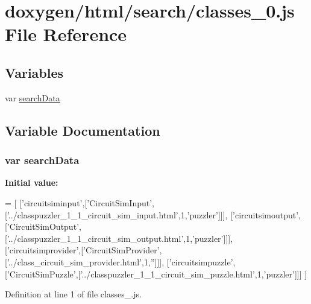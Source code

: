 \hypertarget{a00061}{}\section{doxygen/html/search/classes\+\_\+0.js File Reference}
\label{a00061}
\subsection*{Variables}
\begin{DoxyCompactItemize}
\item 
var \hyperlink{a00061_ad01a7523f103d6242ef9b0451861231e}{search\+Data}
\end{DoxyCompactItemize}


\subsection{Variable Documentation}
\hypertarget{a00061_ad01a7523f103d6242ef9b0451861231e}{}
\subsubsection[{search\+Data}]{\setlength{\rightskip}{0pt plus 5cm}var search\+Data}\label{a00061_ad01a7523f103d6242ef9b0451861231e}
{\bfseries Initial value\+:}
\begin{DoxyCode}
=
[
  [\textcolor{stringliteral}{'circuitsiminput'},[\textcolor{stringliteral}{'CircuitSimInput'},[\textcolor{stringliteral}{'../classpuzzler\_1\_1\_circuit\_sim\_input.html'},1,\textcolor{stringliteral}{'puzzler'}]]],
  [\textcolor{stringliteral}{'circuitsimoutput'},[\textcolor{stringliteral}{'CircuitSimOutput'},[\textcolor{stringliteral}{'../classpuzzler\_1\_1\_circuit\_sim\_output.html'},1,\textcolor{stringliteral}{'puzzler'}]]],
  [\textcolor{stringliteral}{'circuitsimprovider'},[\textcolor{stringliteral}{'CircuitSimProvider'},[\textcolor{stringliteral}{'../class\_circuit\_sim\_provider.html'},1,\textcolor{stringliteral}{''}]]],
  [\textcolor{stringliteral}{'circuitsimpuzzle'},[\textcolor{stringliteral}{'CircuitSimPuzzle'},[\textcolor{stringliteral}{'../classpuzzler\_1\_1\_circuit\_sim\_puzzle.html'},1,\textcolor{stringliteral}{'puzzler'}]]]
]
\end{DoxyCode}


Definition at line 1 of file classes\+\_.\+js.

